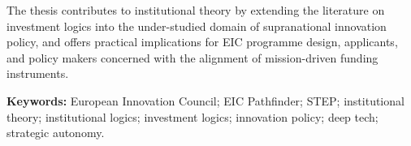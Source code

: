 The thesis contributes to institutional theory by extending the literature on
investment logics into the under-studied domain of supranational innovation
policy, and offers practical implications for EIC programme design,
applicants, and policy makers concerned with the alignment of mission-driven
funding instruments.

\vspace{0.4cm}
\noindent\textbf{Keywords:} European Innovation Council; EIC Pathfinder;
STEP; institutional theory; institutional logics; investment logics;
innovation policy; deep tech; strategic autonomy.
